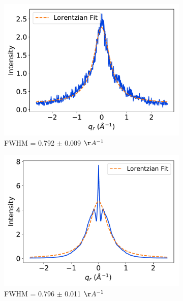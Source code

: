 \documentclass[journal=jpcbfk,manuscript=article]{achemso}
\begin{document}
  \begin{figure}
  \centering
  \begin{subfigure}{0.45\textwidth}
  \includegraphics[width=\textwidth]{exp_rsection_fit.pdf}
  \caption{FWHM = 0.792 $\pm$ 0.009 $\AA^{-1}$}\label{fig:exp_rsection_fit}
  \end{subfigure}
  \begin{subfigure}{0.45\textwidth}
  \includegraphics[width=\textwidth]{sim_rsection_fit.pdf}
  \caption{FWHM = 0.796 $\pm$ 0.011 $\AA^{-1}$}\label{fig:sim_rsection_fit}
  \end{subfigure}
  \begin{subfigure}{0.45\textwidth}

\end{subfigure}
\end{figure}
\end{document}
